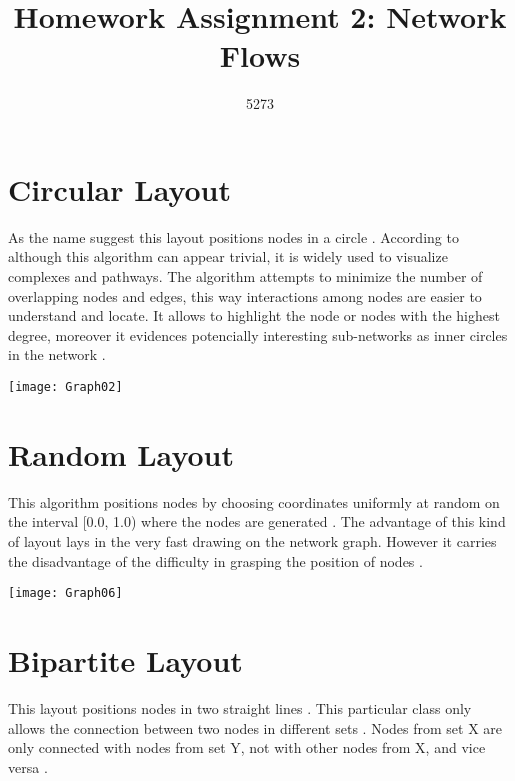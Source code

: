 \documentclass[10pt,a4paper,openany]{article}
\author{5273}
\title{Homework Assignment 2: Network Flows}
\date{}
\begin{document}
	
\maketitle
	
	\section*{Circular Layout}
	As the name suggest this layout positions nodes in a circle \citep{networkx}. According to \citep{tsay2010hierarchically} although this algorithm can appear trivial, it is widely used to visualize complexes and pathways. The algorithm attempts to minimize the number of overlapping nodes and edges, this way interactions among nodes are easier to understand and locate.  It allows to highlight the node or nodes with the highest degree, moreover it evidences potencially interesting sub-networks as inner circles in the network \citep{agapito2013visualization}.
	
	
	
	\begin{center}
		\texttt{[image: Graph02]}
	\end{center}
	
\newpage
	
	\section*{Random Layout}
	This algorithm positions nodes by choosing coordinates uniformly at random on the interval [0.0, 1.0) where the nodes are generated \citep{networkx}. 
	The advantage of this kind of layout lays in the  very  fast drawing on  the  network  graph.  However it carries  the  disadvantage  of  the  difficulty in grasping the position of nodes \citep{mouri2016visualization}.
	
	
	
	\begin{center}
		\texttt{[image: Graph06]}
	\end{center}

\newpage
	
	\section*{Bipartite Layout}
	This layout positions nodes in two straight lines \citep{networkx}. This particular class only allows the connection between two nodes in different sets \citep{easley2010networks}. Nodes from set X are only connected with nodes from set Y, not with other nodes from X, and vice versa \citep{seminar2014}.
	
\end{document}
